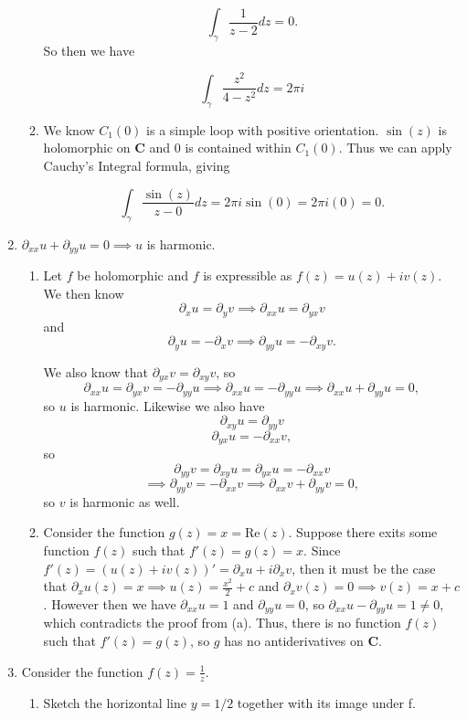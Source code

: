 \documentclass{article}
\newcommand{\C}{\mathbf{C}}
\newcommand{\Real}{\text{Re}}
\begin{document}
\begin{enumerate}
\begin{enumerate}
		\[\int_{\gamma}\frac{1}{z-2}dz= 0. \]	
		So then we have 
		
		\[\int_{\gamma}\frac{z^2}{4-z^2}dz=2\pi i \]
		\item We know $C_1(0)$ is a simple loop with positive orientation. $\sin(z)$ is holomorphic on $\C$ and 0 is contained within $C_1(0)$. Thus we can apply Cauchy's Integral formula, giving
		
		\[\int_{\gamma}\frac{\sin(z)}{z-0}dz=2\pi i\sin(0)=2\pi i(0)=0. \]
	\end{enumerate}
	
	\item $\partial_{xx}u+\partial_{yy}u=0\implies u$ is harmonic.
	\begin{enumerate}
		\item Let $f$ be holomorphic and $f$ is expressible as $f(z)=u(z)+iv(z)$. We then know
		\[\partial_x u = \partial_y v \implies \partial_{xx}u=\partial_{yx}v \]
		and
		\[\partial_y u = -\partial_x v \implies \partial_{yy}u=-\partial_{xy}v. \]
		
		We also know that $\partial_{yx}v=\partial_{xy}v$, so
		\[\partial_{xx}u=\partial_{yx}v=-\partial_{yy}u\implies \partial_{xx}u=-\partial_{yy}u\implies \partial_{xx}u+\partial_{yy}u=0, \]
		so $u$ is harmonic. Likewise we also have
		\[\partial_{xy}u=\partial_{yy}v \]
		\[\partial_{yx}u=-\partial_{xx}v, \]
		so
		\[\partial_{yy}v=\partial_{xy}u=\partial_{yx}u=-\partial_{xx}v \]
		\[ \implies \partial_{yy}v=-\partial_{xx}v \implies \partial_{xx}v+\partial_{yy}v=0, \]
		so $v$ is harmonic as well.
		
		\item Consider the function $g(z)=x=\Real(z)$. Suppose there exits some function $f(z)$ such that $f'(z)=g(z)=x$. Since $f'(z)=(u(z)+iv(z))'=\partial_xu+i\partial_xv$, then it must be the case that $\partial_xu(z)=x\implies u(z)=\frac{x^2}{2}+c$ and $\partial_xv(z)=0\implies v(z)=x+c$. However then we have $\partial_{xx}u=1$ and $\partial_{yy}u=0$, so $\partial_{xx}u-\partial_{yy}u=1\neq 0$, which contradicts the proof from (a). Thus, there is no function $f(z)$ such that $f'(z)=g(z)$, so $g$  has no antiderivatives on $\C$.
	\end{enumerate}
	
	\item Consider the function $f(z)=\frac{1}{z}$.
	\begin{enumerate}
		\item Sketch the horizontal line $y=1/2$ together with its image under f.
		

\end{enumerate}
\end{enumerate}
\end{document}
